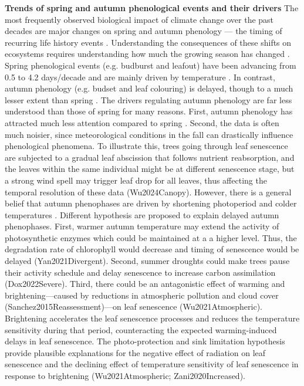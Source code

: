 \documentclass{article}
\begin{document}
\textbf{Trends of spring and autumn phenological events and their drivers}
The most frequently observed biological impact of climate change over the past decades are major changes on spring and autumn phenology --- the timing of recurring life history events \cite{parmesan_globally_2003,cleland_shifting_2007,lieth_phenology_1974,woolway_phenological_2021,menzel_european_2006}. Understanding the consequences of these shifts on ecosystems requires understanding how much the growing season has changed \cite{duputie_phenological_2015}. Spring phenological events (e.g. budburst and leafout) have been advancing from 0.5 \cite{wolfe_climate_2005} to 4.2 days/decade \cite{chmielewski_response_2001,fu_recent_2014} and are mainly driven by temperature \cite{chuine_why_2010,cleland_shifting_2007,penuelas_responses_2001}. In contrast, autumn phenology (e.g. budset and leaf colouring) is delayed, though to a much lesser extent than spring \cite{gallinat_autumn_2015,jeong_macroscale_2014}. The drivers regulating autumn phenology are far less understood than those of spring for many reasons. First, autumn phenology has attracted much less attention compared to spring \cite{piao_plant_2019}. Second, the data is often much noisier, since meteorological conditions in the fall can drastically influence phenological phenomena. To illustrate this, trees going through leaf senescence are subjected to a gradual leaf abscission that follows nutrient reabsorption, and the leaves within the same individual might be at different senescence stage, but a strong wind spell may trigger leaf drop for all leaves, thus affecting the temporal resolution of these data (Wu2024Canopy). However, there is a general belief that autumn phenophases are driven by shortening photoperiod and colder temperatures \cite{cooke_dynamic_2012,flynn_temperature_2018,korner_phenology_2010,delpierre_temperate_2016}. Different hypothesis are proposed to explain delayed autumn phenophases. First, warmer autumn temperature may extend the activity of photosynthetic enzymes which could be maintained at a a higher level. Thus, the degradation rate of chlorophyll would decrease and timing of senescence would be delayed (Yan2021Divergent). Second, summer droughts could make trees pause their activity schedule and delay senescence to increase carbon assimilation (Dox2022Severe). Third, there could be an antagonistic effect of warming and brightening---caused by reductions in atmospheric pollution and cloud cover (Sanchez2015Reassessment)---on leaf senescence (Wu2021Atmospheric). Brightening accelerates the leaf senescence processes and reduces the temperature sensitivity during that period, counteracting the expected warming-induced delays in leaf senescence. The photo-protection and sink limitation hypothesis provide plausible explanations for the negative effect of radiation on leaf senescence and the declining effect of temperature sensitivity of leaf senescence in response to brightening (Wu2021Atmospheric; Zani2020Increased). \\
\end{document}
